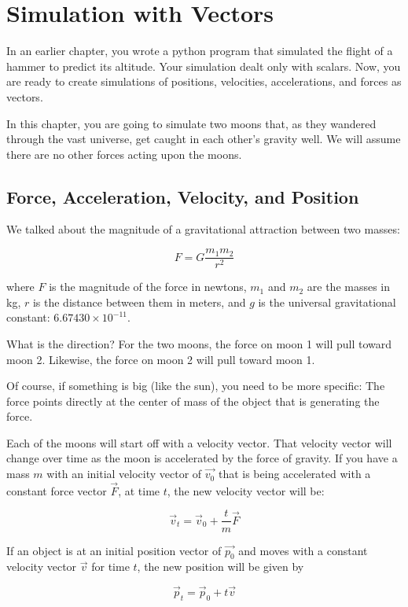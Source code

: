 \chapter{Simulation with Vectors}

In an earlier chapter, you wrote a python program that simulated the flight of a hammer to predict its altitude. Your simulation
dealt only with scalars.  Now, you are ready to create simulations of positions, velocities, accelerations, and forces as vectors.

In this chapter, you are going to simulate two moons that, as they wandered through the vast universe,  get caught
in each other's gravity well.   We will assume there are no other forces acting upon the moons.

\section{Force, Acceleration, Velocity, and Position}

We talked about the magnitude of a gravitational attraction between two masses:

$$F = G\frac{m_1 m_2}{r^2}$$

where $F$ is the magnitude of the force in newtons, $m_1$ and $m_2$ are the masses in kg,  $r$ is the distance between them in meters, and $g$ is the universal gravitational constant: $6.67430 \times 10^{−11}$.

What is the direction?  For the two moons,  the force on moon 1 will pull toward moon 2.  
Likewise, the force on moon 2 will pull toward moon 1.
 
Of course,  if something is big (like the sun),  you need to be more specific:  The force points directly at the center
of mass of the object that is generating the force.

Each of the moons will start off with a velocity vector. That velocity vector will change over time as the moon is
accelerated by the force of gravity.  If you have a mass $m$ with an initial velocity vector of $\vec{v_0}$ that is being accelerated with a constant force vector $\vec{F}$, at time $t$, the new velocity vector will be:

$$\vec{v}_t = \vec{v}_0  + \frac{t}{m}  \vec{F}$$

If an object is at an initial position vector of $\vec{p_0}$ and moves with a constant velocity vector $\vec{v}$ 
for time $t$,  the new position will be given by 

$$\vec{p}_t = \vec{p}_0  + t \vec{v}$$

